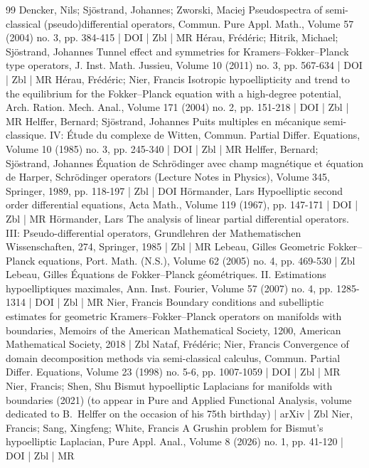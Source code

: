 \begin{thebibliography}{99}
 Dencker, Nils; Sjöstrand, Johannes; Zworski, Maciej Pseudospectra of semi-classical (pseudo)differential operators, Commun. Pure Appl. Math., Volume 57 (2004) no. 3, pp. 384-415 | DOI | Zbl | MR
 Hérau, Frédéric; Hitrik, Michael; Sjöstrand, Johannes Tunnel effect and symmetries for Kramers–Fokker–Planck type operators, J. Inst. Math. Jussieu, Volume 10 (2011) no. 3, pp. 567-634 | DOI | Zbl | MR
 Hérau, Frédéric; Nier, Francis Isotropic hypoellipticity and trend to the equilibrium for the Fokker–Planck equation with a high-degree potential, Arch. Ration. Mech. Anal., Volume 171 (2004) no. 2, pp. 151-218 | DOI | Zbl | MR
 Helffer, Bernard; Sjöstrand, Johannes Puits multiples en mécanique semi-classique. IV: Étude du complexe de Witten, Commun. Partial Differ. Equations, Volume 10 (1985) no. 3, pp. 245-340 | DOI | Zbl | MR
 Helffer, Bernard; Sjöstrand, Johannes Équation de Schrödinger avec champ magnétique et équation de Harper, Schrödinger operators (Lecture Notes in Physics), Volume 345, Springer, 1989, pp. 118-197 | Zbl | DOI
 Hörmander, Lars Hypoelliptic second order differential equations, Acta Math., Volume 119 (1967), pp. 147-171 | DOI | Zbl | MR
 Hörmander, Lars The analysis of linear partial differential operators. III: Pseudo-differential operators, Grundlehren der Mathematischen Wissenschaften, 274, Springer, 1985 | Zbl | MR
 Lebeau, Gilles Geometric Fokker–Planck equations, Port. Math. (N.S.), Volume 62 (2005) no. 4, pp. 469-530 | Zbl
 Lebeau, Gilles Équations de Fokker–Planck géométriques. II. Estimations hypoelliptiques maximales, Ann. Inst. Fourier, Volume 57 (2007) no. 4, pp. 1285-1314 | DOI | Zbl | MR
 Nier, Francis Boundary conditions and subelliptic estimates for geometric Kramers–Fokker–Planck operators on manifolds with boundaries, Memoirs of the American Mathematical Society, 1200, American Mathematical Society, 2018 | Zbl
 Nataf, Frédéric; Nier, Francis Convergence of domain decomposition methods via semi-classical calculus, Commun. Partial Differ. Equations, Volume 23 (1998) no. 5-6, pp. 1007-1059 | DOI | Zbl | MR
 Nier, Francis; Shen, Shu Bismut hypoelliptic Laplacians for manifolds with boundaries (2021) (to appear in Pure and Applied Functional Analysis, volume dedicated to B. Helffer on the occasion of his 75th birthday) | arXiv | Zbl
 Nier, Francis; Sang, Xingfeng; White, Francis A Grushin problem for Bismut’s hypoelliptic Laplacian, Pure Appl. Anal., Volume 8 (2026) no. 1, pp. 41-120 | DOI | Zbl | MR

\end{thebibliography}
